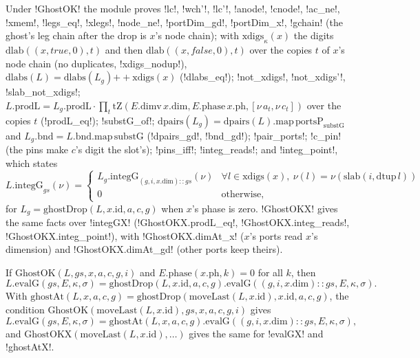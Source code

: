 Under \lean!GhostOK! the module proves \lean!lc!, \lean!wch'!, \lean!lc'!, \lean!anode!, \lean!cnode!, \lean!ac_ne!, \lean!xmem!, \lean!legs_eq!, \lean!xlegs!, \lean!node_ne!, \lean!portDim_gd!, \lean!portDim_x!, \lean!gchain! (the ghost's leg chain after the drop is $x$'s node chain); with $\mathrm{xdigs}_\kappa(x)$ the digits $\mathrm{dlab}((x,\mathit{true},0),t)$ and then $\mathrm{dlab}((x,\mathit{false},0),t)$ over the copies $t$ of $x$'s node chain (no duplicates, \lean!xdigs_nodup!), $\mathrm{dlabs}(L)=\mathrm{dlabs}(L_g)\mathbin{+\!\!+}\mathrm{xdigs}(x)$ (\lean!dlabs_eq!); \lean!not_xdigs!, \lean!not_xdigs'!, \lean!slab_not_xdigs!; $L.\mathrm{prodL}=L_g.\mathrm{prodL}\cdot\prod_t\mathrm{tZ}(E.\mathrm{dimv}\,x.\mathrm{dim},E.\mathrm{phase}\,x.\mathrm{ph},[\nu\,a_t,\nu\,c_t])$ over the copies $t$ (\lean!prodL_eq!); \lean!substG_of!; $\mathrm{dpairs}(L_g)=\mathrm{dpairs}(L).\mathrm{map}\,\mathrm{portsP}_{\mathrm{substG}}$ and $L_g.\mathrm{bnd}=L.\mathrm{bnd.map}\,\mathrm{substG}$ (\lean!dpairs_gd!, \lean!bnd_gd!); \lean!pair_ports!; \lean!c_pin! (the pins make $c$'s digit the slot's); \lean!pins_iff!; \lean!integ_reads!; and \lean!integ_point!, which states
\[
L.\mathrm{integG}_{gs}(\nu)=\begin{cases}L_g.\mathrm{integG}_{(g,i,x.\mathrm{dim})::gs}(\nu)&\forall l\in\mathrm{xdigs}(x),\ \nu(l)=\nu(\mathrm{slab}(i,\mathrm{dtup}\,l))\\0&\text{otherwise,}\end{cases}
\]
for $L_g=\mathrm{ghostDrop}(L,x.\mathrm{id},a,c,g)$ when $x$'s phase is zero. \lean!GhostOKX! gives the same facts over \lean!integGX! (\lean!GhostOKX.prodL_eq!, \lean!GhostOKX.integ_reads!, \lean!GhostOKX.integ_point!), with \lean!GhostOKX.dimAt_x! ($x$'s ports read $x$'s dimension) and \lean!GhostOKX.dimAt_gd! (other ports keep theirs).

\begin{theorem}\label{thm:lean-sym-ghost}
If $\mathrm{GhostOK}(L,gs,x,a,c,g,i)$ and $E.\mathrm{phase}(x.\mathrm{ph},k)=0$ for all $k$, then
\[
L.\mathrm{evalG}(gs,E,\kappa,\sigma)=\mathrm{ghostDrop}(L,x.\mathrm{id},a,c,g).\mathrm{evalG}((g,i,x.\mathrm{dim})\mathbin{::}gs,E,\kappa,\sigma).
\]
With $\mathrm{ghostAt}(L,x,a,c,g)=\mathrm{ghostDrop}(\mathrm{moveLast}(L,x.\mathrm{id}),x.\mathrm{id},a,c,g)$, the condition $\mathrm{GhostOK}(\mathrm{moveLast}(L,x.\mathrm{id}),gs,x,a,c,g,i)$ gives
\[
L.\mathrm{evalG}(gs,E,\kappa,\sigma)=\mathrm{ghostAt}(L,x,a,c,g).\mathrm{evalG}((g,i,x.\mathrm{dim})\mathbin{::}gs,E,\kappa,\sigma),
\]
and $\mathrm{GhostOKX}(\mathrm{moveLast}(L,x.\mathrm{id}),\ldots)$ gives the same for \lean!evalGX! and \lean!ghostAtX!.
\end{theorem}


